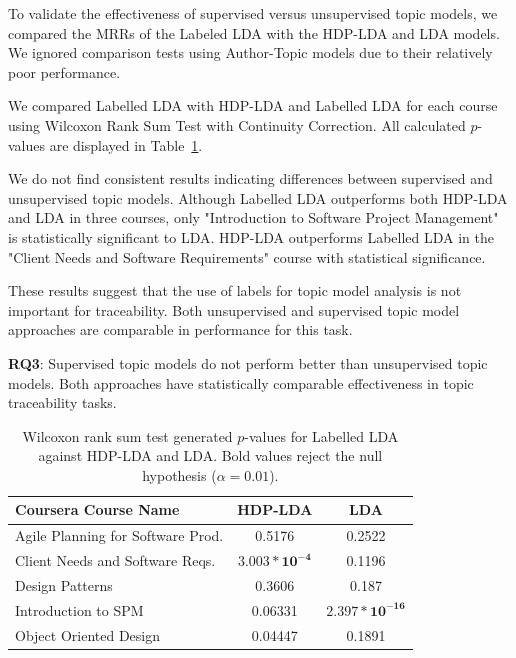 \documentclass[sigconf, anonymous]{acmart}
\begin{document}

To validate the effectiveness of supervised versus unsupervised topic models, we compared the MRRs of the Labeled LDA with the HDP-LDA and LDA models.
We ignored comparison tests using Author-Topic models due to their relatively poor performance.

We compared Labelled LDA with HDP-LDA and Labelled LDA for each course using Wilcoxon Rank Sum Test with Continuity Correction.
All calculated $p$-values are displayed in Table~\ref{tab:sup-unsup-test}.

We do not find consistent results indicating differences between supervised and unsupervised topic models.
Although Labelled LDA outperforms both HDP-LDA and LDA in three courses, only "Introduction to Software Project Management" is statistically significant to LDA.
HDP-LDA outperforms Labelled LDA in the "Client Needs and Software Requirements" course with statistical significance.

These results suggest that the use of labels for topic model analysis is not important for traceability. Both unsupervised and supervised topic model approaches are comparable in performance for this task.

\begin{tcolorbox}[sharp corners, top=1mm, bottom=1mm]
\textbf{RQ3}: Supervised topic models do not perform better than unsupervised topic models. Both approaches have statistically comparable effectiveness in topic traceability tasks.
\end{tcolorbox} %

\begin{table}
    \centering
    \begin{tabular}{l*{2}{c}}
    \toprule
    Coursera Course Name & HDP-LDA & LDA \\
    \midrule
    Agile Planning for Software Prod. & 0.5176 & 0.2522 \\
    Client Needs and Software Reqs. & $\mathbf{3.003*10^{-4}}$ & 0.1196 \\
    Design Patterns & 0.3606 & 0.187 \\
    Introduction to SPM & 0.06331 & $\mathbf{2.397*10^{-16}}$ \\
    Object Oriented Design & 0.04447 & 0.1891 \\
    \bottomrule
    \end{tabular}
    \caption{Wilcoxon rank sum test generated $p$-values for Labelled LDA against HDP-LDA and LDA. Bold values reject the null hypothesis ($\alpha=0.01$).}
    \label{tab:sup-unsup-test}
\end{table}
\end{document}
